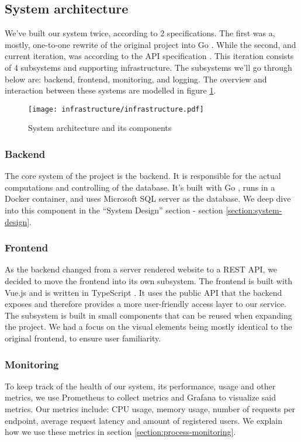 \subsection{System architecture}
We've built our system twice, according to 2 specifications. The first was a, mostly, one-to-one rewrite of the original project into Go \cite{tool:go}.
While the second, and current iteration, was according to the API specification \cite{spec:api}. 
This iteration consists of 4 subsystems and supporting infrastructure. The subsystems we'll go through below are: backend, frontend, monitoring, and logging.
The overview and interaction between these systems are modelled in figure \ref{fig:architecture}.
\begin{figure}[H]
    \centering
    \texttt{[image: infrastructure/infrastructure.pdf]}
    \caption{System architecture and its components}
    \label{fig:architecture}
\end{figure}

\subsubsection{Backend}
The core system of the project is the backend. It is responsible for the actual computations and controlling of the database.
It's built with Go \cite{tool:go}, runs in a Docker container, and uses Microsoft SQL server \cite{tool:microsoft-sql-server} as the database. We deep dive into this component in the ``System Design'' section - section \ref{section:system-design}.

\subsubsection{Frontend}
As the backend changed from a server rendered website to a REST API, we decided to move the frontend into its own subsystem.
The frontend is built with Vue.js \cite{tool:vue} and is written in TypeScript \cite{tool:typescript}.
It uses the public API that the backend exposes and therefore provides a more user-friendly access layer to our service.
The subsystem is built in small components that can be reused when expanding the project. We had a focus on the visual elements being mostly identical to the original frontend, to ensure user familiarity.

\subsubsection{Monitoring}
To keep track of the health of our system, its performance, usage and other metrics, we use Prometheus \cite{tool:prometheus} to collect metrics and Grafana \cite{tool:grafana} to visualize said metrics.
Our metrics include: CPU usage, memory usage, number of requests per endpoint, average request latency and amount of registered users.
We explain how we use these metrics in section \ref{section:process-monitoring}.

